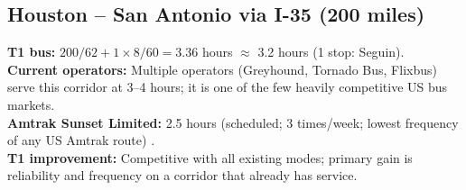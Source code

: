 \subsection{Houston -- San Antonio via I-35 (200 miles)}

\textbf{T1 bus:} $200 / 62 + 1 \times 8/60 = 3.36$ hours $\approx$ 3.2 hours (1 stop: Seguin). \\
\textbf{Current operators:} Multiple operators (Greyhound, Tornado Bus, Flixbus) serve this corridor at 3--4 hours; it is one of the few heavily competitive US bus markets. \\
\textbf{Amtrak Sunset Limited:} 2.5 hours (scheduled; 3 times/week; lowest frequency of any US Amtrak route) \citep{Amtrak2023}. \\
\textbf{T1 improvement:} Competitive with all existing modes; primary gain is reliability and frequency on a corridor that already has service.

